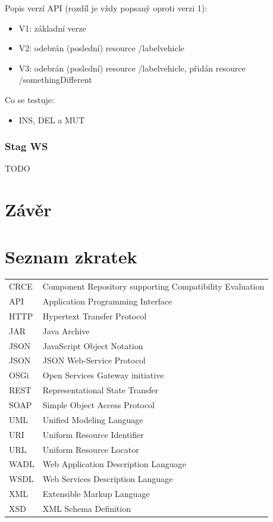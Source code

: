 \documentclass[czech,DP]{thesiskiv}
\newcommand\nomenclature[2]{#1 & #2 \\}
\begin{document}
Popis verzí API (rozdíl je vždy popsaný oproti verzi 1):
\begin{itemize}
	\item V1: základní verze
	\item V2: odebrán (poslední) resource /labelvehicle
	\item V3: odebrán (poslední) resource /labelvehicle, přidán resource /somethingDifferent
\end{itemize}

Co se testuje:
\begin{itemize}
	\item  INS, DEL a MUT
\end{itemize}

\subsection{Stag WS}

TODO

\chapter{Závěr}	

 
% 
%

{\raggedright\small

}

\chapter*{Seznam zkratek}

\begin{longtable}{@{}p{3cm}@{}p{\dimexpr\textwidth-1cm\relax}@{}}
	\nomenclature{CRCE}{Component Repository supporting Compatibility Evaluation}
	\nomenclature{API}{Application Programming Interface}
	\nomenclature{HTTP}{Hypertext Transfer Protocol}
	\nomenclature{JAR}{Java Archive}
	\nomenclature{JSON}{JavaScript Object Notation}
	\nomenclature{JSON}{JSON Web-Service Protocol}
	\nomenclature{OSGi}{Open Services Gateway initiative}
	\nomenclature{REST}{Representational State Transfer}
	\nomenclature{SOAP}{Simple Object Access Protocol}
	\nomenclature{UML}{Unified Modeling Language}
	\nomenclature{URI}{Uniform Resource Identifier}
	\nomenclature{URL}{Uniform Resource Locator}
	\nomenclature{WADL}{Web Application Description Language}
	\nomenclature{WSDL}{Web Services Description Language}
	\nomenclature{XML}{Extensible Markup Language}
	\nomenclature{XSD}{XML Schema Definition}
\end{longtable}
\end{document}
